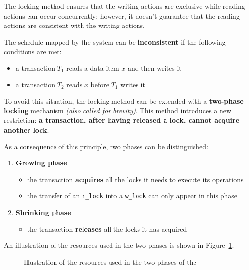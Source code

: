 \documentclass[english]{article}
\begin{document}
The locking method ensures that the writing actions are exclusive while reading actions can occur concurrently;
however, it doesn't guarantee that the reading actions are consistent with the writing actions.

The schedule mapped by the \cc system can be \textbf{inconsistent} if the following conditions are met:

\begin{itemize}
  \item a transaction \(T_1\) reads a data item \(x\) and then writes it
  \item a transaction \(T_2\) reads \(x\) before \(T_1\) writes it
\end{itemize}

To avoid this situation, the locking method can be extended with a \textbf{two-phase locking} mechanism \textit{(also called
  \tpl for brevity)}.
This method introduces a new restriction: \textbf{a transaction, after having released a lock, cannot acquire another lock}.

As a consequence of this principle, two phases can be distinguished:

\begin{enumerate}
  \item \textbf{Growing phase}
        \begin{itemize}
          \item the transaction \textbf{acquires} all the locks it needs to execute its operations
          \item the transfer of an \texttt{r\_lock} into a \texttt{w\_lock} can only appear in this phase
        \end{itemize}
  \item \textbf{Shrinking phase}
        \begin{itemize}
          \item the transaction \textbf{releases} all the locks it has acquired
        \end{itemize}
\end{enumerate}

An illustration of the resources used in the two phases is shown in Figure~\ref{fig:resources-use-phases-two-phases-locking}.

\begin{figure}[htbp]
  \centering
  \bigskip
  \caption{Illustration of the resources used in the two phases of the \tpl}
  \label{fig:resources-use-phases-two-phases-locking}
  \bigskip
\end{figure}
\end{document}
